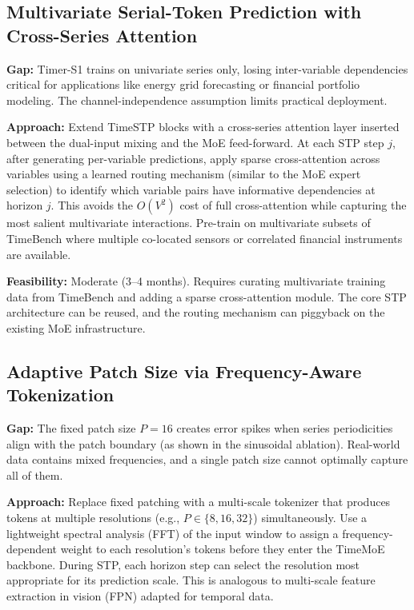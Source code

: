 \documentclass[11pt]{article}
\begin{document}
\subsection{Multivariate Serial-Token Prediction with Cross-Series Attention}

\textbf{Gap:} Timer-S1 trains on univariate series only, losing inter-variable dependencies critical for applications like energy grid forecasting or financial portfolio modeling. The channel-independence assumption limits practical deployment.

\textbf{Approach:} Extend TimeSTP blocks with a cross-series attention layer inserted between the dual-input mixing and the MoE feed-forward. At each STP step $j$, after generating per-variable predictions, apply sparse cross-attention across variables using a learned routing mechanism (similar to the MoE expert selection) to identify which variable pairs have informative dependencies at horizon $j$. This avoids the $O(V^2)$ cost of full cross-attention while capturing the most salient multivariate interactions. Pre-train on multivariate subsets of TimeBench where multiple co-located sensors or correlated financial instruments are available.

\textbf{Feasibility:} Moderate (3--4 months). Requires curating multivariate training data from TimeBench and adding a sparse cross-attention module. The core STP architecture can be reused, and the routing mechanism can piggyback on the existing MoE infrastructure.

\subsection{Adaptive Patch Size via Frequency-Aware Tokenization}

\textbf{Gap:} The fixed patch size $P{=}16$ creates error spikes when series periodicities align with the patch boundary (as shown in the sinusoidal ablation). Real-world data contains mixed frequencies, and a single patch size cannot optimally capture all of them.

\textbf{Approach:} Replace fixed patching with a multi-scale tokenizer that produces tokens at multiple resolutions (e.g., $P \in \{8, 16, 32\}$) simultaneously. Use a lightweight spectral analysis (FFT) of the input window to assign a frequency-dependent weight to each resolution's tokens before they enter the TimeMoE backbone. During STP, each horizon step can select the resolution most appropriate for its prediction scale. This is analogous to multi-scale feature extraction in vision (FPN) adapted for temporal data.
\end{document}
